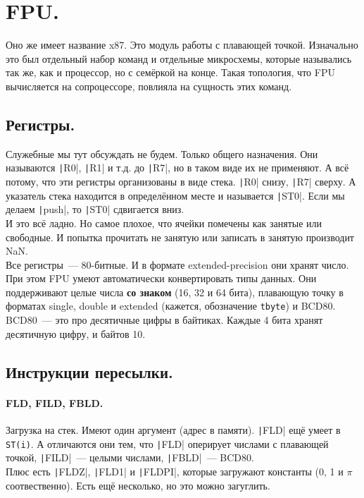 \documentclass{article}
\begin{document}
    \section{FPU.}
    Оно же имеет название x87. Это модуль работы с плавающей точкой. Изначально это был отдельный набор команд и отдельные микросхемы, которые назывались так же, как и процессор, но с семёркой на конце. Такая топология, что FPU вычисляется на сопроцессоре, повлияла на сущность этих команд.
    \subsection{Регистры.}
    Служебные мы тут обсуждать не будем. Только общего назначения. Они называются \texttt|R0|, \texttt|R1| и т.д. до \texttt|R7|, но в таком виде их не применяют. А всё потому, что эти регистры организованы в виде стека. \texttt|R0| снизу, \texttt|R7| сверху. А указатель стека находится в определённом месте и называется \texttt|ST0|. Если мы делаем \texttt|push|, то \texttt|ST0| сдвигается вниз.\\
    И это всё ладно. Но самое плохое, что ячейки помечены как занятые или свободные. И попытка прочитать не занятую или записать в занятую производит NaN.\\
    Все регистры~--- 80-битные. И в формате extended-precision они хранят число. При этом FPU умеют автоматически конвертировать типы данных. Они поддерживают целые числа \textbf{со знаком} (16, 32 и 64 бита), плавающую точку в форматах single, double и extended (кажется, обозначение \Verb|tbyte|) и BCD80. BCD80~--- это про десятичные цифры в байтиках. Каждые 4 бита хранят десятичную цифру, и байтов 10.
    \subsection{Инструкции пересылки.}
    \paragraph{FLD, FILD, FBLD.}
    Загрузка на стек. Имеют один аргумент (адрес в памяти). \texttt|FLD| ещё умеет в \Verb|ST(i)|. А отличаются они тем, что \texttt|FLD| оперирует числами с плавающей точкой, \texttt|FILD|~--- целыми числами, \texttt|FBLD|~--- BCD80.\\
    Плюс есть \texttt|FLDZ|, \texttt|FLD1| и \texttt|FLDPI|, которые загружают константы (0, 1 и $\pi$ соотвественно). Есть ещё несколько, но это можно загуглить.
\end{document}
